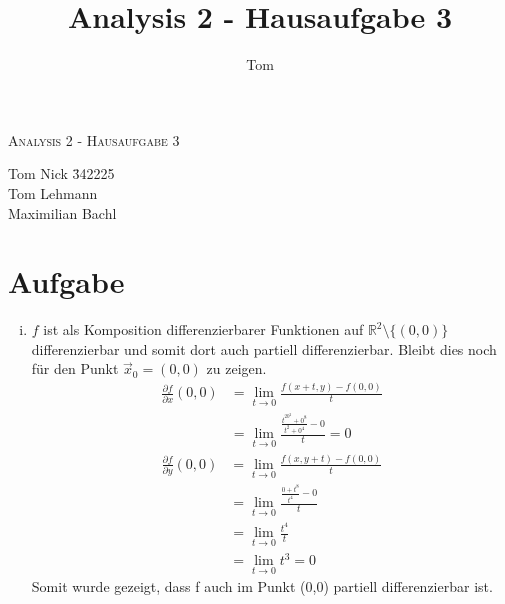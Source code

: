 \documentclass[10pt,a4paper,parskip=half]{scrartcl}
\author{Tom}
\title{Analysis 2 - Hausaufgabe 3}
\newcommand{\R}{\mathbb{R}}
\begin{document}
\begin{center}
\textsc{\Large{Analysis 2 - Hausaufgabe 3}} \\
\end{center}
\begin{tabbing}
Tom Nick \hspace{1.4cm}\= 342225\\
Tom Lehmann\\
Maximilian Bachl
\end{tabbing}
\section{Aufgabe}
\begin{enumerate}[(i)]
\item
$f$ ist als Komposition differenzierbarer Funktionen auf $\R^2\setminus{\{(0,0)\}}$ differenzierbar und somit dort auch partiell differenzierbar. Bleibt dies noch für den Punkt $\vec x_0 = (0,0)$ zu zeigen.
\begin{align*}
\frac{\partial f}{\partial x} (0,0)&= \lim_{t \to 0} \frac{f(x+t,y)-f(0,0)}{t}\\
&= \lim_{t \to 0} \frac{\frac{t^20^2+0^8}{t^2+0^4} -0}{t} = 0
\end{align*}
\begin{align*}
\frac{\partial f}{\partial y} (0,0)&= \lim_{t \to 0} \frac{f(x,y+t)-f(0,0)}{t}\\
&= \lim_{t \to 0} \frac{\frac{0+t^8}{t^4} - 0}{t} \\
&= \lim_{t \to 0} \frac{t^4}{t} \\
&= \lim_{t \to 0} t^3 = 0
\end{align*}
Somit wurde gezeigt, dass f auch im Punkt (0,0) partiell differenzierbar ist.


\end{enumerate}
\end{document}
